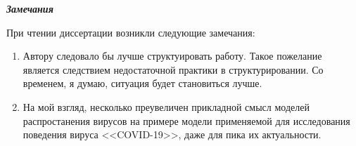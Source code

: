 \documentclass[12pt, a4paper, titlepage]{extarticle}
\begin{document}










	\textbf{\textit{Замечания}}

		При чтении диссертации возникли следующие замечания:
		\begin{enumerate}
			\item Автору следовало бы лучше структуировать работу. Такое пожелание является следствием недостаточной практики в структурировании. Со временем, я думаю, ситуация будет становиться лучше.
			
			\item На мой взгляд, несколько преувеличен прикладной смысл моделей распростанения вирусов на примере модели применяемой для исследования поведения вируса <<COVID-19>>, даже для пика их актуальности.
		\end{enumerate}
\end{document}
